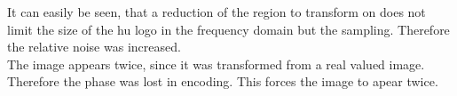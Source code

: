\documentclass[12pt,a4paper]{article}
\begin{document}
	It can easily be seen, that a reduction of the region to
	transform on does not limit the size of the hu logo in the
	frequency domain but the sampling. Therefore the relative
	noise was increased.\\
	The image appears twice, since it was transformed from a
	real valued image. Therefore the phase was lost in encoding.
	This forces the image to apear twice.
\end{document}

